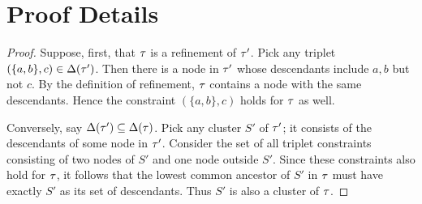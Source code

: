 \section{Proof Details}
\label{sec:ibhc-proof}

\treerefinement*
\begin{proof}

Suppose, first, that $\tau$ is a refinement of $\tau'$. Pick any triplet $(\{a,b\},c) \in \Delta(\tau')$. Then there is a node in $\tau'$ whose descendants include $a,b$ but not $c$. By the definition of refinement, $\tau$ contains a node with the same descendants. Hence the constraint $(\{a,b\},c)$ holds for $\tau$ as well.

Conversely, say $\Delta(\tau') \subseteq \Delta(\tau)$. Pick any cluster $S'$ of $\tau'$; it consists of the descendants of some node in $\tau'$. Consider the set of all triplet constraints consisting of two nodes of $S'$ and one node outside $S'$. Since these constraints also hold for $\tau$, it follows that the lowest common ancestor of $S'$ in $\tau$ must have exactly $S'$ as its set of descendants. Thus $S'$ is also a cluster of $\tau$.
\end{proof}


